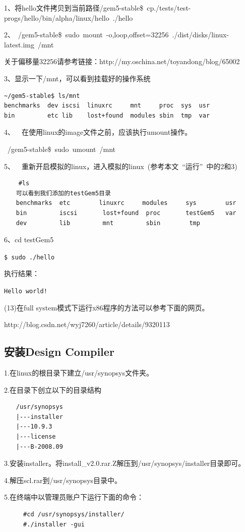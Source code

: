 1、将hello文件拷贝到当前路径/gem5-stable\$ cp./tests/test-progs/hello/bin/alpha/linux/hello ./hello  

2、~/gem5-stable\$ sudo mount -o,loop,offset=32256 ./dist/disks/linux-latest.img /mnt  

关于偏移量32256请参考链接：http://my.oschina.net/toyandong/blog/65002  

3、显示一下/mnt，可以看到挂载好的操作系统  
\begin{verbatim}
~/gem5-stable$ ls/mnt  
benchmarks  dev iscsi  linuxrc     mnt     proc  sys  usr  
bin         etc lib    lost+found  modules sbin  tmp  var  
\end{verbatim}

4、  在使用linux的image文件之前，应该执行umount操作。  

~/gem5-stable\$ sudo umount /mnt  

5、  重新开启模拟的linux，进入模拟的linux (参考本文 “运行” 中的2和3)  
\begin{verbatim}
    #ls  
　　可以看到我们添加的testGem5目录
　　benchmarks  etc        linuxrc     modules     sys        usr
　　bin         iscsi       lost+found  proc       testGem5   var
　　dev         lib         mnt         sbin        tmp
\end{verbatim}

6、cd testGem5

\verb"$ sudo ./hello"

执行结果：

\verb"Hello world!"

(13)在full system模式下运行x86程序的方法可以参考下面的网页。

http://blog.csdn.net/wyj7260/article/details/9320113

\subsection{安装Design Compiler}
1.在linux的根目录下建立/usr/synopsys文件夹。

2.在目录下创立以下的目录结构
\begin{verbatim}
　　/usr/synopsys 
　　|---installer
　　|---10.9.3
　　|---license
　　|---B-2008.09
\end{verbatim}

3.安装installer。将install\_v2.0.rar.Z解压到/usr/synopsys/installer目录即可。

4.解压scl.rar到/usr/synopsys目录中。

5.在终端中以管理员账户下运行下面的命令：
\begin{verbatim}
　　	#cd /usr/synopsys/installer/
　　	#./installer -gui
\end{verbatim}

